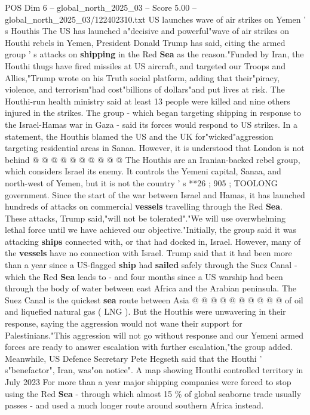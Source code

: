 \begin{textsample}{POS Dim 6 – global\_north\_2025\_03 – Score 5.00 – global\_north\_2025\_03/122402310.txt}  \label{ex:f6_pos_230}
US launches wave of air strikes on Yemen ' s Houthis The US has launched a"decisive and powerful"wave of air strikes on Houthi rebels in Yemen, President Donald Trump has said, citing the armed group ' s attacks on \textbf{shipping} in the Red \textbf{Sea} as the reason."Funded by Iran, the Houthi thugs have fired missiles at US aircraft, and targeted our Troops and Allies,"Trump wrote on his Truth social platform, adding that their"piracy, violence, and terrorism"had cost"billions of dollars"and put lives at risk.
The Houthi-run health ministry said at least 13 people were killed and nine others injured in the strikes.
The group - which began targeting shipping in response to the Israel-Hamas war in Gaza - said its forces would respond to US strikes.
In a statement, the Houthis blamed the US and the UK for"wicked"aggression targeting residential areas in Sanaa.
However, it is understood that London is not behind @ @ @ @ @ @ @ @ @ @ The Houthis are an Iranian-backed rebel group, which considers Israel its enemy.
It controls the Yemeni capital, Sanaa, and north-west of Yemen, but it is not the country ' s **26 ; 905 ; TOOLONG government.
Since the start of the war between Israel and Hamas, it has launched hundreds of attacks on commercial \textbf{vessels} travelling through the Red \textbf{Sea}.
These attacks, Trump said,"will not be tolerated"."We will use overwhelming lethal force until we have achieved our objective."Initially, the group said it was attacking \textbf{ships} connected with, or that had docked in, Israel.
However, many of the \textbf{vessels} have no connection with Israel.
Trump said that it had been more than a year since a US-flagged \textbf{ship} had \textbf{sailed} safely through the Suez Canal - which the Red \textbf{Sea} leads to - and four months since a US warship had been through the body of water between east Africa and the Arabian peninsula.
The Suez Canal is the quickest \textbf{sea} route between Asia @ @ @ @ @ @ @ @ @ @ of oil and liquefied natural gas ( LNG ).
But the Houthis were unwavering in their response, saying the aggression would not wane their support for Palestinians."This aggression will not go without response and our Yemeni armed forces are ready to answer escalation with further escalation,"the group added.
Meanwhile, US Defence Secretary Pete Hegseth said that the Houthi ' s"benefactor", Iran, was"on notice".
A map showing Houthi controlled territory in July 2023 For more than a year major shipping companies were forced to stop using the Red \textbf{Sea} - through which almost 15 \% of global seaborne trade usually passes - and used a much longer route around southern Africa instead.

\end{textsample}
